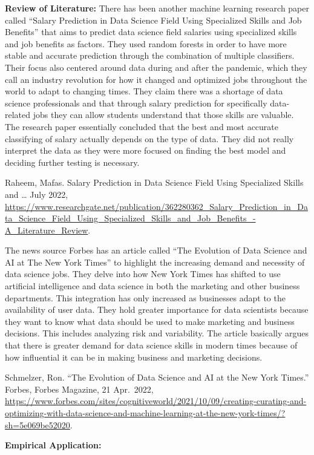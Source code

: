\documentclass[
]{article}
\begin{document}
\textbf{Review of Literature:} There has been another machine learning
research paper called ``Salary Prediction in Data Science Field Using
Specialized Skills and Job Benefits'' that aims to predict data science
field salaries using specialized skills and job benefits as factors.
They used random forests in order to have more stable and accurate
prediction through the combination of multiple classifiers. Their focus
also centered around data during and after the pandemic, which they call
an industry revolution for how it changed and optimized jobs throughout
the world to adapt to changing times. They claim there was a shortage of
data science professionals and that through salary prediction for
specifically data-related jobs they can allow students understand that
those skills are valuable. The research paper essentially concluded that
the best and most accurate classifying of salary actually depends on the
type of data. They did not really interpret the data as they were more
focused on finding the best model and deciding further testing is
necessary.

Raheem, Mafas. Salary Prediction in Data Science Field Using Specialized
Skills and \ldots{} July 2022,
\url{https://www.researchgate.net/publication/362280362_Salary_Prediction_in_Data_Science_Field_Using_Specialized_Skills_and_Job_Benefits_-A_Literature_Review}.

The news source Forbes has an article called ``The Evolution of Data
Science and AI at The New York Times'' to highlight the increasing
demand and necessity of data science jobs. They delve into how New York
Times has shifted to use artificial intelligence and data science in
both the marketing and other business departments. This integration has
only increased as businesses adapt to the availability of user data.
They hold greater importance for data scientists because they want to
know what data should be used to make marketing and business decisions.
This includes analyzing risk and variability. The article basically
argues that there is greater demand for data science skills in modern
times because of how influential it can be in making business and
marketing decisions.

Schmelzer, Ron. ``The Evolution of Data Science and AI at the New York
Times.'' Forbes, Forbes Magazine, 21 Apr.~2022,
\url{https://www.forbes.com/sites/cognitiveworld/2021/10/09/creating-curating-and-optimizing-with-data-science-and-machine-learning-at-the-new-york-times/?sh=5e069be52020}.

\textbf{Empirical Application:}
\end{document}
